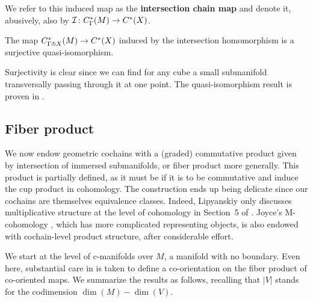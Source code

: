 We refer to this induced map as the \textbf{intersection chain map} and denote it, abusively, also by $\mathcal{I} \colon C_\Gamma^*(M)\to C^*(X)$.

\begin{theorem}\label{T:stokes}
	The map $C^*_{\Gamma \pitchfork X}(M) \to C^{\ast}(X)$ induced by the intersection homomorphism is a surjective quasi-isomorphism.
\end{theorem}

Surjectivity is clear since we can find for any cube a small submanifold transversally passing through it at one point.
The quasi-isomorphism result is proven in \cite{medina2022foundations}.

\subsection{Fiber product}\label{S:fiber product section}

We now endow geometric cochains with a (graded) commutative product given by intersection of immersed submanifolds, or fiber product more generally.
This product is partially defined, as it must be if it is to be commutative and induce the cup product in cohomology.
The construction ends up being delicate since our cochains are themselves equivalence classes.
Indeed, Lipyanskiy only discusses multiplicative structure at the level of cohomology in Section~5 of \cite{Lipy14}.
Joyce's M-cohomology \cite{Joyc15}, which has more complicated representing objects, is also endowed with cochain-level product structure,
after considerable effort.

We start at the level of c-manifolds over $M$, a manifold with no boundary.
Even here, substantial care in \cite{medina2022foundations} is taken to define a co-orientation
on the fiber product of co-oriented maps. We summarize the results as follows, recalling that $|V|$ stands for the codimension $\dim(M)-\dim(V)$.

